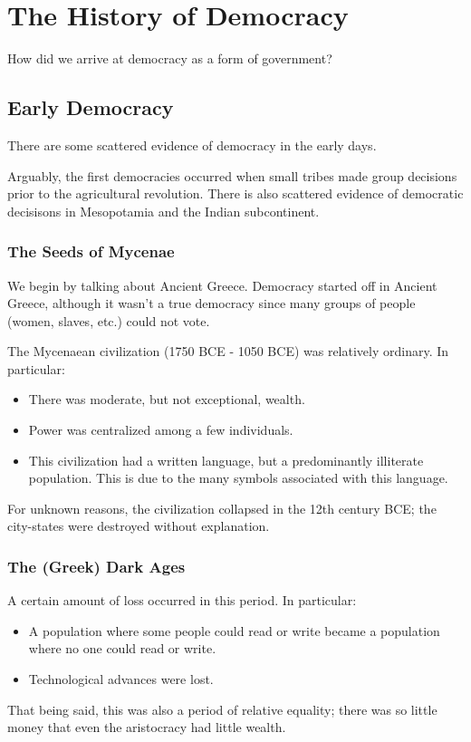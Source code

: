 \documentclass[letterpaper]{article}
\begin{document}
\section{The History of Democracy}
How did we arrive at democracy as a form of government? 

\subsection{Early Democracy}
There are some scattered evidence of democracy in the early days. 

\bigskip 

Arguably, the first democracies occurred when small tribes made group decisions prior to the agricultural revolution. There is also scattered evidence of democratic decisisons in Mesopotamia and the Indian subcontinent. 

\subsubsection{The Seeds of Mycenae}
We begin by talking about Ancient Greece. Democracy started off in Ancient Greece, although it wasn't a true democracy since many groups of people (women, slaves, etc.) could not vote. 

\bigskip 

The Mycenaean civilization (1750 BCE - 1050 BCE) was relatively ordinary. In particular:
\begin{itemize}
    \item There was moderate, but not exceptional, wealth. 
    \item Power was centralized among a few individuals.
    \item This civilization had a written language, but a predominantly illiterate population. This is due to the many symbols associated with this language. 
\end{itemize}
For unknown reasons, the civilization collapsed in the 12th century BCE; the city-states were destroyed without explanation. 

\subsubsection{The (Greek) Dark Ages}
A certain amount of loss occurred in this period. In particular:
\begin{itemize}
    \item A population where some people could read or write became a population where no one could read or write. 
    \item Technological advances were lost. 
\end{itemize}
That being said, this was also a period of relative equality; there was so little money that even the aristocracy had little wealth. 
\end{document}
